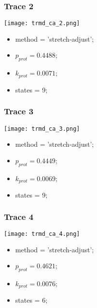 \subsubsection{Trace 2}
\begin{minipage}[c]{0.7\textwidth}
    \texttt{[image: trmd\_ca\_2.png]}
\end{minipage}
\hfill
\begin{minipage}[c]{0.45\textwidth}
    \begin{itemize}
        \item method = 'stretch-adjust';
        \item $p_{prot}=0.4488$;
        \item $k_{prot}=0.0071$;
        \item states = 9;
    \end{itemize}
\end{minipage}

\subsubsection{Trace 3}
\begin{minipage}[c]{0.7\textwidth}
    \texttt{[image: trmd\_ca\_3.png]}
\end{minipage}
\hfill
\begin{minipage}[c]{0.45\textwidth}
    \begin{itemize}
        \item method = 'stretch-adjust';
        \item $p_{prot}=0.4449$;
        \item $k_{prot}=0.0069$;
        \item states = 9;
    \end{itemize}
\end{minipage}

\subsubsection{Trace 4}
\begin{minipage}[c]{0.7\textwidth}
    \texttt{[image: trmd\_ca\_4.png]}
\end{minipage}
\hfill
\begin{minipage}[c]{0.45\textwidth}
    \begin{itemize}
        \item method = 'stretch-adjust';
        \item $p_{prot}=0.4621$;
        \item $k_{prot}=0.0076$;
        \item states = 6;
    \end{itemize}
\end{minipage}

